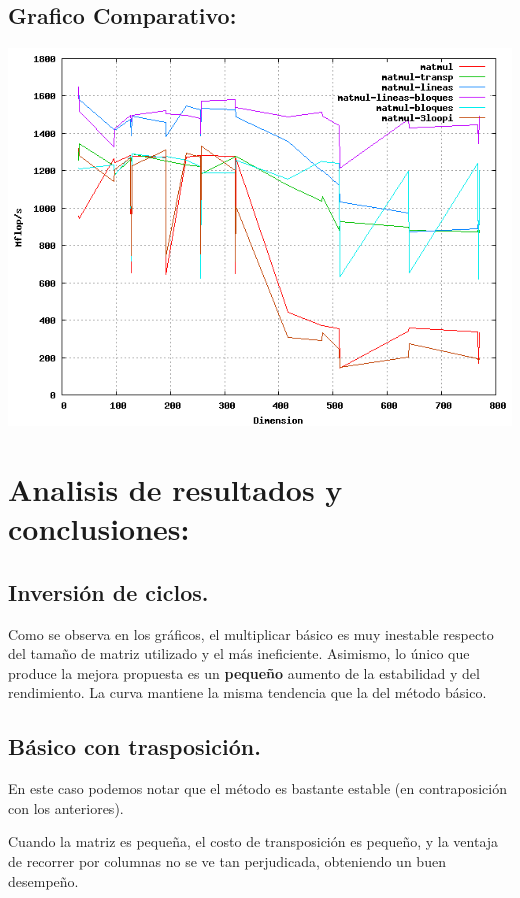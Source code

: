 \documentclass[a4paper,10pt]{article}
\begin{document}
\subsection{Grafico Comparativo: }

\includegraphics[width=15cm, bb=0 0 640 480]{core2-plot.png}
\clearpage

\section{Analisis de resultados y conclusiones: }

\subsection{Inversión de ciclos.}

Como se observa en los gráficos, el multiplicar básico es muy inestable respecto del tamaño de matriz utilizado y el más ineficiente. Asimismo, lo único que produce la mejora propuesta es un \textbf{pequeño} aumento de la estabilidad y del rendimiento. La curva mantiene la misma tendencia que la del método básico.

\subsection{Básico con trasposición.}

En este caso podemos notar que el método es bastante estable (en contraposición con los anteriores).

Cuando la matriz es pequeña, el costo de transposición es pequeño, y la ventaja de recorrer por columnas no se ve tan perjudicada, obteniendo un buen desempeño. 
\end{document}
